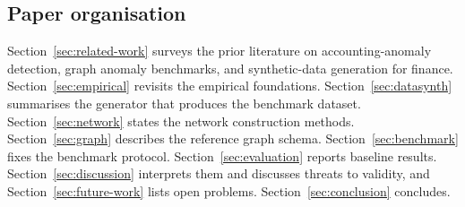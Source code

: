 \subsection{Paper organisation}
\label{sec:introduction:organisation}

Section~\ref{sec:related-work} surveys the prior literature on
accounting-anomaly detection, graph anomaly benchmarks, and
synthetic-data generation for finance.  Section~\ref{sec:empirical}
revisits the empirical foundations.  Section~\ref{sec:datasynth}
summarises the \system{} generator that produces the
benchmark dataset.  Section~\ref{sec:network} states the network
construction methods.  Section~\ref{sec:graph} describes the
reference graph schema.  Section~\ref{sec:benchmark} fixes the
benchmark protocol.  Section~\ref{sec:evaluation} reports baseline
results.  Section~\ref{sec:discussion} interprets them and discusses
threats to validity, and Section~\ref{sec:future-work} lists open
problems.  Section~\ref{sec:conclusion} concludes.
